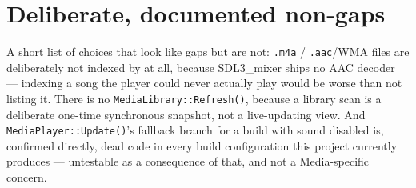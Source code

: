 \section{Deliberate, documented non-gaps}

A short list of choices that look like gaps but are not: \texttt{.m4a} / \texttt{.aac}/WMA
files are deliberately not indexed by  at all, because SDL3\_mixer
ships no AAC decoder --- indexing a song the player could never actually play would be worse
than not listing it. There is no \texttt{MediaLibrary::Refresh()}, because a library scan is
a deliberate one-time synchronous snapshot, not a live-updating view. And
\texttt{MediaPlayer::Update()}'s fallback branch for a build with sound disabled is,
confirmed directly, dead code in every build configuration this project currently produces
--- untestable as a consequence of that, and not a Media-specific concern.
